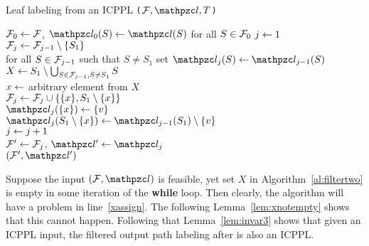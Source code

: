 \begin{algorithm}[h]
  \caption{Leaf labeling from an ICPPL {\tt \filterii($\cF, \cl, T$)}}
  \label{al:filtertwo} %
  \begin{algorithmic}[\lndisplay]
    \STATE ${\cal F}_0 \leftarrow {\cal F}$, $\cl_0(S) \assign \cl(S)$ for all $S
    \in {\cal F}_0$ 
    \STATE $j \leftarrow 1$\\
    \label{uniqueleaf}
    \STATE ${\cal F}_j \leftarrow {\cal F}_{j-1} \setminus \{S_1\}$\\
    \STATE for all $S \in {\cal F}_{j-1}$ such that $S \ne S_1$ set
    $\cl_j(S) \assign
    \cl_{j-1}(S)$\\
    \STATE $X \leftarrow S_1 \setminus \bigcup_{S \in {\cal F}_{j-1}, S \ne S_1}S$\\
    \STATE \label{xassign} $x \leftarrow $ arbitrary element from $X$\\
    \STATE ${\cal F}_j \leftarrow {\cal F}_j \cup \{\{x\}, S_1 \setminus \{x\}\} $\\
    \STATE $\cl_j(\{x\}) \assign \{v\}$\\
    \STATE $\cl_j(S_1 \setminus \{x\}) \assign \cl_{j-1}(S_1) \setminus \{v\}$\\
    \STATE $j \leftarrow j+1$\\
    \ENDWHILE
    \STATE ${\cal F}' \leftarrow {\cal F}_j$, $\cl' \assign \cl_j$\\
    \RETURN $(\cF', \cl')$
  \end{algorithmic}
\end{algorithm}


Suppose the input $(\cF, \cl)$ is feasible, yet set $X$ in
Algorithm~\ref{al:filtertwo} is empty in some iteration of the {\bf
  while} loop. Then clearly, the algorithm will have a problem in line~\ref{xassign}.
The following Lemma~\ref{lem:xnotempty} shows that this cannot
happen. Following that Lemma~\ref{lem:invar3} shows that given an
ICPPL input, the filtered output path labeling after \filterii
is also an ICPPL.


